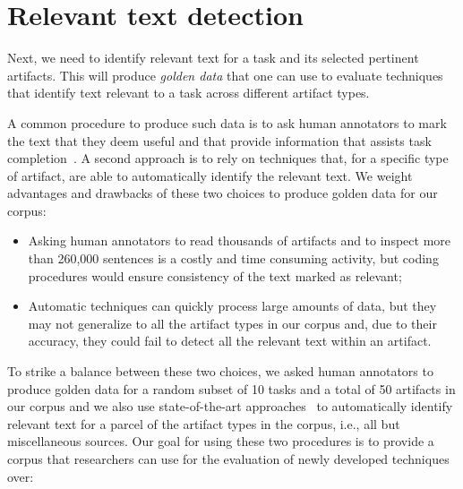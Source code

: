 


\section{Relevant text detection}
\label{cp4:corpus-relevant-text}





Next, we need to identify relevant text for a task and its selected pertinent artifacts.
This will produce \textit{golden data} that one can use to evaluate  
techniques that identify text relevant to a task across different artifact types. 



A common procedure to produce such data is to ask human annotators to
mark the text that they deem useful and that provide information that assists task completion~\cite{nadi2020, Robillard2015, marques2020}.
A second approach is to rely on techniques that, for a specific type of artifact, are able to automatically 
identify the relevant text.
We weight advantages and drawbacks of these two choices to produce golden data for our corpus:


\begin{itemize}
    \item Asking human annotators to read thousands of artifacts and to inspect more than 260,000 sentences
    is a costly and time consuming activity, but coding procedures would ensure consistency of the text marked as relevant; 
    \item Automatic techniques can quickly process large amounts of data, but they may not generalize to all the artifact types in our corpus and, due to their accuracy, they could fail to detect all the relevant text within an artifact.
\end{itemize}



To strike a balance between these two choices, we asked human annotators to produce golden data for a random subset of 10 tasks and a total of 50 artifacts in our corpus and we also use state-of-the-art approaches~\cite{nadi2020, Robillard2015, Lotufo2012, Xu2017} to automatically identify relevant text for a parcel of the artifact types in the corpus, i.e., all but miscellaneous sources. 
Our goal for using these two procedures is to provide a corpus that researchers can use for the evaluation of newly developed techniques over:


